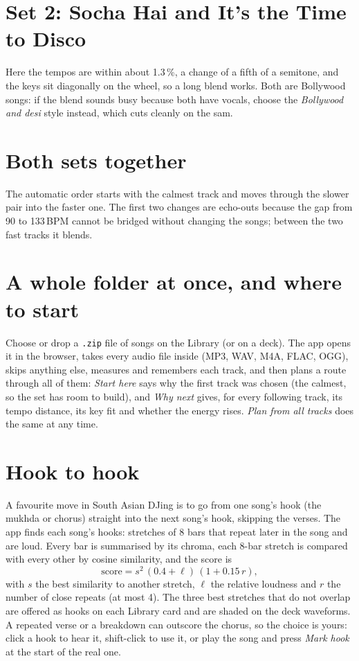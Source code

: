 \section{Set 2: Socha Hai and It's the Time to Disco}

Here the tempos are within about 1.3\,\%, a change of a fifth of a semitone, and the keys sit diagonally on the wheel, so a long blend works. Both are Bollywood songs: if the blend sounds busy because both have vocals, choose the \emph{Bollywood and desi} style instead, which cuts cleanly on the sam.

\section{Both sets together}

The automatic order starts with the calmest track and moves through the slower pair into the faster one. The first two changes are echo-outs because the gap from 90 to 133\,BPM cannot be bridged without changing the songs; between the two fast tracks it blends.

\section{A whole folder at once, and where to start}
Choose or drop a \texttt{.zip} file of songs on the Library (or on a deck). The app opens it in the browser, takes every audio file inside (MP3, WAV, M4A, FLAC, OGG), skips anything else, measures and remembers each track, and then plans a route through all of them: \emph{Start here} says why the first track was chosen (the calmest, so the set has room to build), and \emph{Why next} gives, for every following track, its tempo distance, its key fit and whether the energy rises. \emph{Plan from all tracks} does the same at any time.

\section{Hook to hook}
A favourite move in South Asian DJing is to go from one song's hook (the mukhda or chorus) straight into the next song's hook, skipping the verses. The app finds each song's hooks: stretches of 8 bars that repeat later in the song and are loud. Every bar is summarised by its chroma, each 8-bar stretch is compared with every other by cosine similarity, and the score is
\[ \text{score} = s^2\,(0.4 + \ell)\,(1 + 0.15\,r), \]
with $s$ the best similarity to another stretch, $\ell$ the relative loudness and $r$ the number of close repeats (at most 4). The three best stretches that do not overlap are offered as hooks on each Library card and are shaded on the deck waveforms. A repeated verse or a breakdown can outscore the chorus, so the choice is yours: click a hook to hear it, shift-click to use it, or play the song and press \emph{Mark hook} at the start of the real one.

